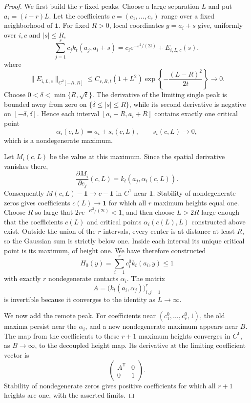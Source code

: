 \begin{proof}
We first build the \(r\) fixed peaks. Choose a large separation \(L\) and
put \(a_i=(i-r)L\). Let the coefficients
\(c=(c_1,\ldots,c_r)\) range over a fixed neighborhood of
\(\boldsymbol1\). For fixed \(R>0\), local coordinates \(y=a_i+s\) give,
uniformly over \(i,c\) and \(|s|\le R\),
\[
    \sum_{j=1}^r c_jk_t(a_j,a_i+s)
    =
    c_i e^{-s^2/(2t)}+E_{i,L,c}(s),
\]
where
\begin{equation}
\label{eq:nonmon-separated-error}
    \|E_{i,L,c}\|_{C^2[-R,R]}
    \le
    C_{r,R,t}(1+L^2)
    \exp\left\{-\frac{(L-R)^2}{2t}\right\}
    \longrightarrow0.
\end{equation}
Choose \(0<\delta<\min\{R,\sqrt t\}\). The derivative of the limiting
single peak is bounded away from zero on
\(\{\delta\le |s|\le R\}\), while its second derivative is negative on
\([-\delta,\delta]\). Hence each interval
\([a_i-R,a_i+R]\) contains exactly one critical point
\[
    \alpha_i(c,L)=a_i+s_i(c,L),
    \qquad s_i(c,L)\to0,
\]
which is a nondegenerate maximum.

Let \(M_i(c,L)\) be the value at this maximum. Since the spatial derivative
vanishes there,
\[
    \frac{\partial M_i}{\partial c_j}(c,L)
    =
    k_t(a_j,\alpha_i(c,L)).
\]
Consequently \(M(c,L)-\boldsymbol1\to c-\boldsymbol1\) in \(C^1\) near
\(\boldsymbol1\). Stability of nondegenerate zeros gives coefficients
\(c(L)\to\boldsymbol1\) for which all \(r\) maximum heights equal one.
Choose \(R\) so large that \(2r e^{-R^2/(2t)}<1\), and then choose
\(L>2R\) large enough that the coefficients \(c(L)\) and critical points
\(\alpha_i(c(L),L)\) constructed above exist. Outside the union of
the \(r\) intervals, every center is at distance at least \(R\), so the
Gaussian sum is strictly below one. Inside each interval its unique critical
point is its maximum, of height one. We have therefore constructed
\[
    H_0(y)=\sum_{i=1}^r c_i^0k_t(a_i,y)\le1
\]
with exactly \(r\) nondegenerate contacts \(\alpha_i\). The matrix
\[
    A=\bigl(k_t(a_i,\alpha_j)\bigr)_{i,j=1}^r
\]
is invertible because it converges to the identity as \(L\to\infty\).

We now add the remote peak. For coefficients near
\((c_1^0,\ldots,c_r^0,1)\), the old maxima persist near the
\(\alpha_i\), and a new nondegenerate maximum appears near \(B\). The map
from the coefficients to these \(r+1\) maximum heights converges in \(C^1\),
as \(B\to\infty\), to the decoupled height map. Its derivative at the
limiting coefficient vector is
\[
    \begin{pmatrix}
        A^{\mathsf T}&0\\
        0&1
    \end{pmatrix}.
\]
Stability of nondegenerate zeros gives positive coefficients for which all
\(r+1\) heights are one, with the asserted limits.


\end{proof}
